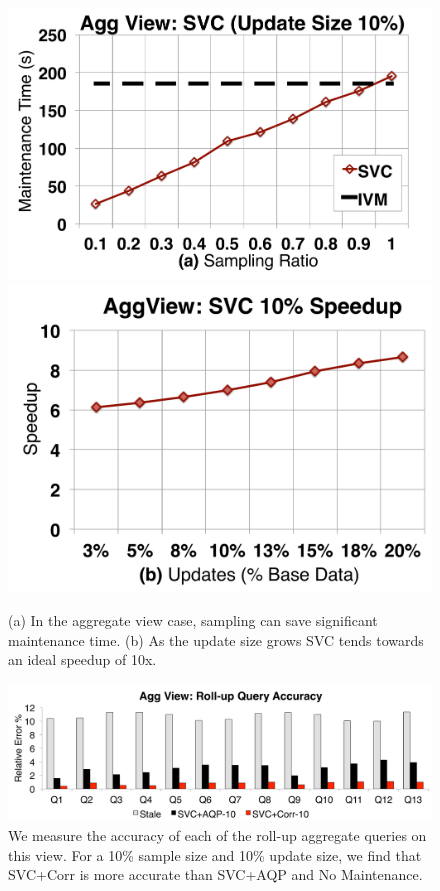 \begin{figure}[t]
\centering
 \includegraphics[scale=0.15]{exp/msdc_1.pdf}
 \includegraphics[scale=0.15]{exp/msdc_2.pdf}
   \caption{(a) In the aggregate view case, sampling can save significant maintenance time. (b) As the update size grows SVC tends towards an ideal speedup of 10x.\label{exp2-acc-sample}}
\end{figure}


\begin{figure}[t]
\centering
 \includegraphics[scale=0.17]{exp/msdc_3.pdf}
   \caption{We measure the accuracy of each of the roll-up aggregate queries on this view. For a 10\% sample size and 10\% update size, we find that SVC+Corr is more accurate than SVC+AQP and No Maintenance.\label{exp2-acc-sample2}}
\end{figure}



